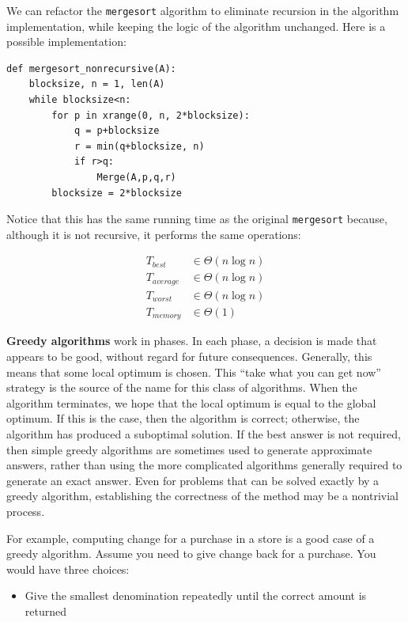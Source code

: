 \documentclass[justified,sixbynine]{tufte-book}
\def\ft{\small\tt}
\theoremstyle{plain}%
\theoremstyle{definition}
\theoremstyle{remark}
\begin{document}
\begin{fullwidth}
We can refactor the {\ft mergesort} algorithm to eliminate recursion in the algorithm implementation, while keeping the logic of the algorithm unchanged. Here is a possible implementation:
\begin{lstlisting}
def mergesort_nonrecursive(A):
    blocksize, n = 1, len(A)
    while blocksize<n:
        for p in xrange(0, n, 2*blocksize):
            q = p+blocksize
            r = min(q+blocksize, n)
            if r>q:
                Merge(A,p,q,r)
        blocksize = 2*blocksize
\end{lstlisting}

Notice that this has the same running time as the original {\ft mergesort} because, although it is not recursive, it performs the same operations:

\begin{align}
T_{best} &\in \Theta (n\log n) \\
T_{average} &\in \Theta (n\log n) \\
T_{worst} &\in \Theta (n\log n) \\
T_{memory} &\in \Theta (1)
\end{align}


{\bf Greedy algorithms}
 work in phases. In each phase, a decision is made
that appears to be good, without regard for future consequences. Generally,
this means that some local optimum is chosen. This ``take what you can get
now'' strategy is the source of the name for this class of algorithms. When
the algorithm terminates, we hope that the local optimum is equal to the
global optimum. If this is the case, then the algorithm is correct;
otherwise, the algorithm has produced a suboptimal solution. If the best
answer is not required, then simple greedy algorithms are sometimes used to
generate approximate answers, rather than using the more complicated
algorithms generally required to generate an exact answer. Even for problems
that can be solved exactly by a greedy algorithm, establishing the
correctness of the method may be a nontrivial process.

For example, computing change for a purchase in a store is a good case of a greedy algorithm.  Assume you need to give change back for a purchase.  You would have three choices:
\begin{itemize}
\item Give the smallest denomination repeatedly until the correct amount is returned


\end{itemize}
\end{fullwidth}
\end{document}
